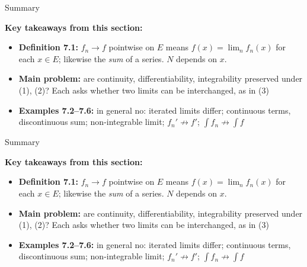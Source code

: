 \documentclass[aspectratio=169,12pt,t]{beamer}
\begin{document}
{%
\begin{frame}{Summary}

  \begin{hlbox}  \textbf{Key takeaways from this section:}
  \begin{itemize}
    \item \textbf{Definition 7.1:} $f_n \to f$ \alert{pointwise} on $E$ means
      $f(x) = \lim_n f_n(x)$ for each $x \in E$; likewise the \emph{sum} of a
      series. $N$ depends on $x$.
    \item \textbf{Main problem:} are continuity, differentiability, integrability
      preserved under (1), (2)? Each asks whether \alert{two limits can be
      interchanged}, as in (3)
    \item \textbf{Examples 7.2--7.6:} in general \alert{no}: iterated limits
      differ; continuous terms, discontinuous sum; non-integrable limit;
      $f_n' \not\to f'$; $\int f_n \not\to \int f$
  \end{itemize}
  \end{hlbox}

\end{frame}

\begin{frame}{Summary}

  \begin{hlbox}  \textbf{Key takeaways from this section:}
  \begin{itemize}
    \item \textbf{Definition 7.1:} $f_n \to f$ \alert{pointwise} on $E$ means
      $f(x) = \lim_n f_n(x)$ for each $x \in E$; likewise the \emph{sum} of a
      series. $N$ depends on $x$.
    \item \textbf{Main problem:} are continuity, differentiability, integrability
      preserved under (1), (2)? Each asks whether \alert{two limits can be
      interchanged}, as in (3)
    \item \textbf{Examples 7.2--7.6:} in general \alert{no}: iterated limits
      differ; continuous terms, discontinuous sum; non-integrable limit;
      $f_n' \not\to f'$; $\int f_n \not\to \int f$
  \end{itemize}


\end{hlbox}
\end{frame}}
\end{document}
